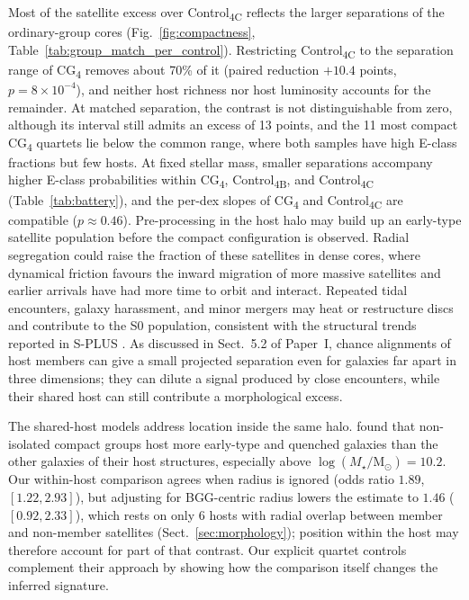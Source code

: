 \documentclass{aa}
\newcommand{\CB}{Control\textsubscript{4B}}
\newcommand{\CC}{Control\textsubscript{4C}}
\newcommand{\CG}{CG\textsubscript{4}}
\newcommand{\msun}{\mathrm{M}_\odot}
\begin{document}
Most of the satellite excess over \CC{} reflects the larger separations of the ordinary-group cores (Fig.~\ref{fig:compactness}, Table~\ref{tab:group_match_per_control}). Restricting \CC{} to the separation range of \CG{} removes about 70\% of it (paired reduction \(+10.4\) points, \(p = 8\times 10^{-4}\)), and neither host richness nor host luminosity accounts for the remainder. At matched separation, the contrast is not distinguishable from zero, although its interval still admits an excess of 13 points, and the 11 most compact \CG{} quartets lie below the common range, where both samples have high E-class fractions but few hosts. At fixed stellar mass, smaller separations accompany higher E-class probabilities within \CG{}, \CB{}, and \CC{} (Table~\ref{tab:battery}), and the per-dex slopes of \CG{} and \CC{} are compatible (\(p \approx 0.46\)). Pre-processing in the host halo may build up an early-type satellite population before the compact configuration is observed. Radial segregation could raise the fraction of these satellites in dense cores, where dynamical friction favours the inward migration of more massive satellites and earlier arrivals have had more time to orbit and interact. Repeated tidal encounters, galaxy harassment, and minor mergers may heat or restructure discs and contribute to the S0 population, consistent with the structural trends reported in S-PLUS \citep{Montaguth2023,Montaguth2025,Montaguth2026MassSize,Montaguth2026NonIsolated}. As discussed in Sect.~5.2 of Paper~I, chance alignments of host members can give a small projected separation even for galaxies far apart in three dimensions; they can dilute a signal produced by close encounters, while their shared host can still contribute a morphological excess.

The shared-host models address location inside the same halo. \citet{Montaguth2026NonIsolated} found that non-isolated compact groups host more early-type and quenched galaxies than the other galaxies of their host structures, especially above \(\log(M_\star/\msun)=10.2\). Our within-host comparison agrees when radius is ignored (odds ratio \(1.89\), \([1.22, 2.93]\)), but adjusting for BGG-centric radius lowers the estimate to \(1.46\) (\([0.92, 2.33]\)), which rests on only 6 hosts with radial overlap between member and non-member satellites (Sect.~\ref{sec:morphology}); position within the host may therefore account for part of that contrast. Our explicit quartet controls complement their approach by showing how the comparison itself changes the inferred signature.
\end{document}
